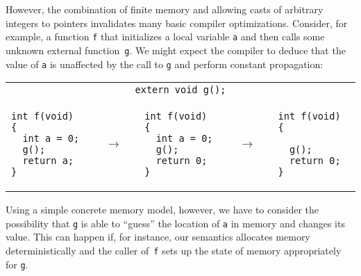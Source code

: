 However, the combination of finite memory and allowing casts
of arbitrary integers to pointers invalidates many basic compiler
optimizations. Consider, for example, a function \texttt{f} that
initializes a local variable \texttt{a} and then calls some unknown
external function~\texttt{g}. We might expect the compiler to deduce
that the value of \texttt{a} is unaffected by the call to \texttt{g}
and perform constant propagation:
\begin{center}
\begin{tabular}{@{}l@{}l@{}l@{}l@{}l@{}}
\multicolumn{5}{c}{\texttt{extern void g();}}
\\
\begin{lstlisting}
int f(void) {
  int a = 0;
  g();
  return a;
}
\end{lstlisting}
&
$\quad\rightarrow\quad$
&
\begin{lstlisting}
int f(void) {
  int a = 0;
  g();
  return 0;
}
\end{lstlisting}
&
$\quad\rightarrow\quad$
&
\begin{lstlisting}
int f(void) {

  g();
  return 0;
}
\end{lstlisting}
\end{tabular}
\end{center}

Using a simple concrete memory model, however, we have to consider the
possibility that \texttt{g} is able to ``guess'' the location of
\texttt{a} in memory and changes its value. This can happen if, for
instance, our semantics allocates memory deterministically and 
the caller of~\texttt{f} sets up the state of memory appropriately for
\texttt{g}.

%

